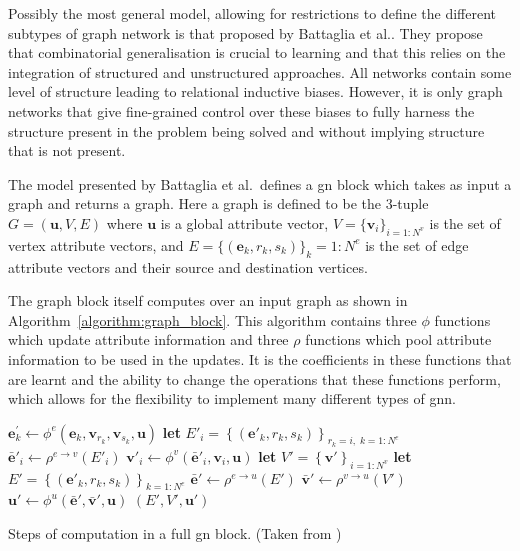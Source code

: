 Possibly the most general model, allowing for restrictions to define the different subtypes of graph network is that proposed by Battaglia et al.\cite{battaglia2018relational}. They propose that combinatorial generalisation is crucial to learning and that this relies on the integration of structured and unstructured approaches. All networks contain some level of structure leading to relational inductive biases. However, it is only graph networks that give fine-grained control over these biases to fully harness the structure present in the problem being solved and without implying structure that is not present.

The model presented by Battaglia et al.\ defines a \ac{gn} block which takes as input a graph and returns a graph. Here a graph is defined to be the 3-tuple $G = (\bm{u}, V, E)$ where $\bm{u}$ is a global attribute vector, $V = \{\bm{v}_i\}_{i=1:N^v}$ is the set of vertex attribute vectors, and $E = \{(\bm{e}_k, r_k, s_k)\}_k=1:N^e$ is the set of edge attribute vectors and their source and destination vertices.

The graph block itself computes over an input graph as shown in Algorithm~\ref{algorithm:graph_block}. This algorithm contains three $\phi$ functions which update attribute information and three $\rho$ functions which pool attribute information to be used in the updates. It is the coefficients in these functions that are learnt and the ability to change the operations that these functions perform, which allows for the flexibility to implement many different types of \ac{gnn}.

\begin{algorithm}[t]
\small
\begin{algorithmic}
        \State $\mathbf{e}_k^\prime\gets \phi^e\left(\mathbf{e}_k, \mathbf{v}_{r_k}, \mathbf{v}_{s_k}, \mathbf{u} \right)$
    \EndFor
        \State \textbf{let} $E'_i = \left\{\left(\mathbf{e}'_k, r_k, s_k \right)\right\}_{r_k=i,\; k=1:N^e}$
        \State $\mathbf{\bar{e}}'_i \gets \rho^{e \rightarrow v}\left(E'_i\right)$
        \State $\mathbf{v}'_i \gets \phi^v\left(\mathbf{\bar{e}}'_i, \mathbf{v}_i, \mathbf{u}\right)$
    \EndFor
    \State \textbf{let} $V' = \left\{\mathbf{v}'\right\}_{i=1:N^v}$
    \State \textbf{let} $E' = \left\{\left(\mathbf{e}'_k, r_k, s_k \right)\right\}_{k=1:N^e}$
    \State $\mathbf{\bar{e}}' \gets \rho^{e \rightarrow u}\left(E'\right)$
    \State $\mathbf{\bar{v}}' \gets \rho^{v \rightarrow u}\left(V'\right)$
    \State $\mathbf{u}' \gets \phi^u\left(\mathbf{\bar{e}}', \mathbf{\bar{v}}', \mathbf{u}\right)$
    \State \Return $(E', V', \mathbf{u}')$
\EndFunction
\end{algorithmic}
\caption{Steps of computation in a full \ac{gn} block. (Taken from \cite{battaglia2018relational})}
\label{algorithm:graph_block}
\end{algorithm}


